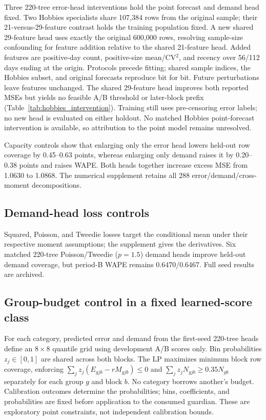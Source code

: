 Three 220-tree error-head interventions hold the point forecast and demand head fixed. Two Hobbies specialists share 107,384 rows from the original sample; their 21-versus-29-feature contrast holds the training population fixed. A new shared 29-feature head uses exactly the original 600,000 rows, resolving sample-size confounding for feature addition relative to the shared 21-feature head. Added features are positive-day count, positive-size mean/CV$^2$, and recency over 56/112 days ending at the origin. Protocols precede fitting; shared sample indices, the Hobbies subset, and original forecasts reproduce bit for bit. Future perturbations leave features unchanged. The shared 29-feature head improves both reported MSEs but yields no feasible A/B threshold or later-block prefix (Table~\ref{tab:hobbies_intervention}). Training still uses pre-censoring error labels; no new head is evaluated on either holdout. No matched Hobbies point-forecast intervention is available, so attribution to the point model remains unresolved.

Capacity controls show that enlarging only the error head lowers held-out row coverage by 0.45--0.63 points, whereas enlarging only demand raises it by 0.20--0.38 points and raises WAPE. Both heads together increase excess MSE from 1.0630 to 1.0868. The numerical supplement retains all 288 error/demand/cross-moment decompositions.

\subsection{Demand-head loss controls}
Squared, Poisson, and Tweedie losses target the conditional mean under their respective moment assumptions; the supplement gives the derivatives. Six matched 220-tree Poisson/Tweedie ($p=1.5$) demand heads improve held-out demand coverage, but period-B WAPE remains 0.6470/0.6467. Full seed results are archived.

\subsection{Group-budget control in a fixed learned-score class}
\label{app:grouplp}
For each category, predicted error and demand from the first-seed 220-tree heads define an $8\times8$ quantile grid using development A/B scores only. Bin probabilities $z_j\in[0,1]$ are shared across both blocks. The LP maximizes minimum block row coverage, enforcing $\sum_j z_j(E_{gjb}-rM_{gjb})\leq0$ and $\sum_jz_jN_{gjb}\geq0.35N_{gb}$ separately for each group $g$ and block $b$. No category borrows another's budget. Calibration outcomes determine the probabilities; bins, coefficients, and probabilities are fixed before application to the consumed guardian. These are exploratory point constraints, not independent calibration bounds.


